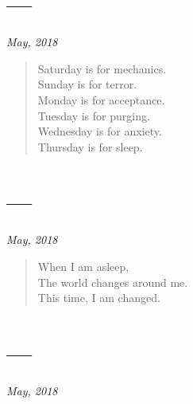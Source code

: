 \section{---}

\hfill\textit{May, 2018}

\begin{verse}
Saturday is for mechanics.\\
Sunday is for terror.\\
Monday is for acceptance.\\
Tuesday is for purging.\\
Wednesday is for anxiety.\\
Thursday is for sleep.
\end{verse}

\newpage
\section{---}

\hfill\textit{May, 2018}

\begin{verse}
When I am asleep,\\
The world changes around me.\\
This time, I am changed.
\end{verse}

\newpage
\section{---}

\hfill\textit{May, 2018}

